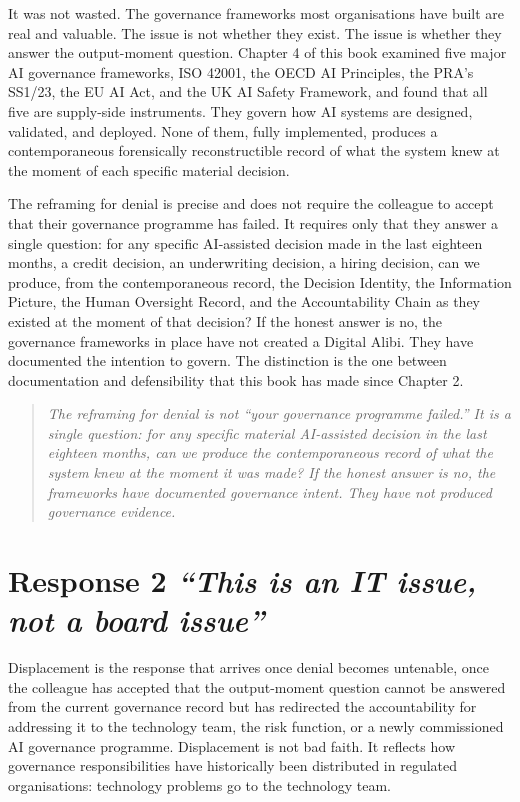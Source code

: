 It was not wasted. The governance frameworks most organisations have built are real and valuable. The issue is not whether they exist. The issue is whether they answer the output-moment question. Chapter 4 of this book examined five major AI governance frameworks, ISO 42001, the OECD AI Principles, the PRA's SS1/23, the EU AI Act, and the UK AI Safety Framework, and found that all five are supply-side instruments. They govern how AI systems are designed, validated, and deployed. None of them, fully implemented, produces a contemporaneous forensically reconstructible record of what the system knew at the moment of each specific material decision.

The reframing for denial is precise and does not require the colleague to accept that their governance programme has failed. It requires only that they answer a single question: for any specific AI-assisted decision made in the last eighteen months, a credit decision, an underwriting decision, a hiring decision, can we produce, from the contemporaneous record, the Decision Identity, the Information Picture, the Human Oversight Record, and the Accountability Chain as they existed at the moment of that decision? If the honest answer is no, the governance frameworks in place have not created a Digital Alibi. They have documented the intention to govern. The distinction is the one between documentation and defensibility that this book has made since Chapter 2.

\begin{quote}
\emph{The reframing for denial is not ``your governance programme failed.'' It is a single question: for any specific material AI-assisted decision in the last eighteen months, can we produce the contemporaneous record of what the system knew at the moment it was made? If the honest answer is no, the frameworks have documented governance intent. They have not produced governance evidence.}
\end{quote}

\scenebreak

\section{\texorpdfstring{Response 2 \emph{``This is an IT issue, not a board issue''}}{Response 2 ``This is an IT issue, not a board issue''}}

Displacement is the response that arrives once denial becomes untenable, once the colleague has accepted that the output-moment question cannot be answered from the current governance record but has redirected the accountability for addressing it to the technology team, the risk function, or a newly commissioned AI governance programme. Displacement is not bad faith. It reflects how governance responsibilities have historically been distributed in regulated organisations: technology problems go to the technology team.

